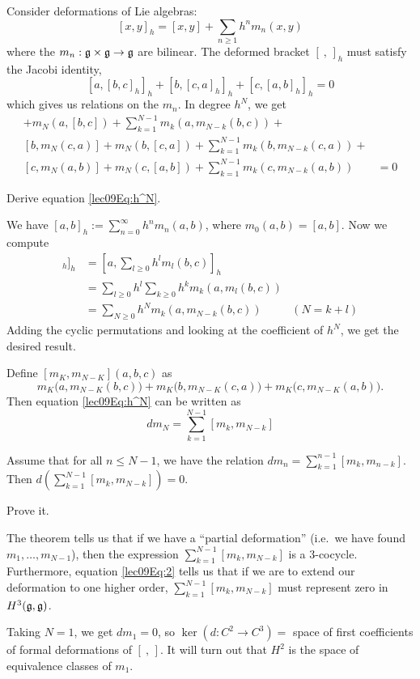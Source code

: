 \begin{itemize}
 Consider deformations of Lie algebras:
 \[
    [x,y]_h = [x,y] + \sum_{n\ge 1} h^n m_n(x,y)
 \]
 where the $m_n:\mathfrak{g}\times \mathfrak{g}\to \mathfrak{g}$ are bilinear. The deformed bracket $[\ ,\,]_h$ must
 satisfy the Jacobi identity,
 \[
    [a,[b,c]_h]_h + [b,[c,a]_h]_h + [c,[a,b]_h]_h = 0
 \]
 which gives us relations on the $m_n$. In degree $h^N$, we get
 \begin{align}
    [a,m_N(b,c)] + m_N(a,[b,c]) + \sum_{k=1}^{N-1} m_k(a,m_{N-k}(b,c)) +& \nonumber \\
    [b,m_N(c,a)] + m_N(b,[c,a]) + \sum_{k=1}^{N-1} m_k(b,m_{N-k}(c,a)) +& \nonumber \\
    [c,m_N(a,b)] + m_N(c,[a,b]) + \sum_{k=1}^{N-1} m_k(c,m_{N-k}(a,b)) &=0
    \label{lec09Eq:h^N}
 \end{align}
 \begin{exercise} \label{lec09Ex2}
   Derive equation \ref{lec09Eq:h^N}.
   \begin{solution}
     We have $[a,b]_h := \sum_{n=0}^\infty h^n m_n(a,b)$, where $m_0(a,b)=[a,b]$.
     Now we compute
     \begin{align*}
       [a,[b,c]_h]_h &= [a,\sum_{l\ge 0} h^l m_l(b,c)]_h\\
                &= \sum_{l\ge 0} h^l \sum_{k\ge 0} h^k m_k(a,m_l(b,c))\\
                &= \sum_{N\ge 0} h^N m_k(a,m_{N-k}(b,c)) & (N=k+l)
     \end{align*}
     Adding the cyclic permutations and looking at the coefficient of $h^N$, we get
     the desired result.
   \end{solution}
 \end{exercise}
 Define $[m_K,m_{N-K}](a,b,c)$ as 
 \[
  m_K\bigl(a,m_{N-K}(b,c)\bigr) + m_K\bigl(b,m_{N-K}(c,a)\bigr) + m_K\bigl(c,m_{N-K}(a,b)\bigr).\]
  Then equation \ref{lec09Eq:h^N} can be written as
 \begin{equation}\label{lec09Eq:2}
    dm_N = \sum_{k=1}^{N-1} [m_k,m_{N-k}] %
 \end{equation}

 \begin{theorem}
  Assume that for all $n \leq N-1$, we have the relation $dm_n = \sum_{k=1}^{n-1}
  [m_k,m_{n-k}]$.  Then $d(\sum_{k=1}^{N-1} [m_k,m_{N-k}])=0$.
 \end{theorem}
 \begin{exercise} \label{lec09Ex3}
    Prove it.
 \end{exercise}
 The theorem tells us that if we have a ``partial deformation'' (i.e.\ we have found
 $m_1,\dots, m_{N-1}$), then the expression $\sum_{k=1}^{N-1} [m_k,m_{N-k}]$ is a
 3-cocycle. Furthermore, equation \ref{lec09Eq:2} tells us that if we are to extend
 our deformation to one higher order, $\sum_{k=1}^{N-1} [m_k,m_{N-k}]$ must represent
 zero in $H^3(\mathfrak{g},\mathfrak{g})$.

  Taking $N=1$, we get $dm_1=0$, so   $\ker(d:C^2\to C^3) = $ space of first
  coefficients of formal deformations of $[\ ,\,]$. It will turn out that $H^2$ is the
  space of equivalence classes of $m_1$.
 \end{itemize}

